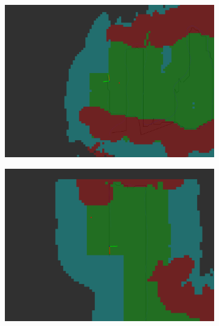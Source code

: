 \begin{figure}[h!]
{\begin{subfigure}[b]{0.5\textwidth}
		\includegraphics[height=0.25\textheight,width=1\textwidth]{fig/results/ex2_alg_1}
		\caption{}
	\end{subfigure}
	\begin{subfigure}[b]{0.5\textwidth}
		\centering
		\includegraphics[height=0.25\textheight,width=1\textwidth]{fig/results/ex2_alg9}
		\caption{}
	\end{subfigure}
	}
\end{figure}
